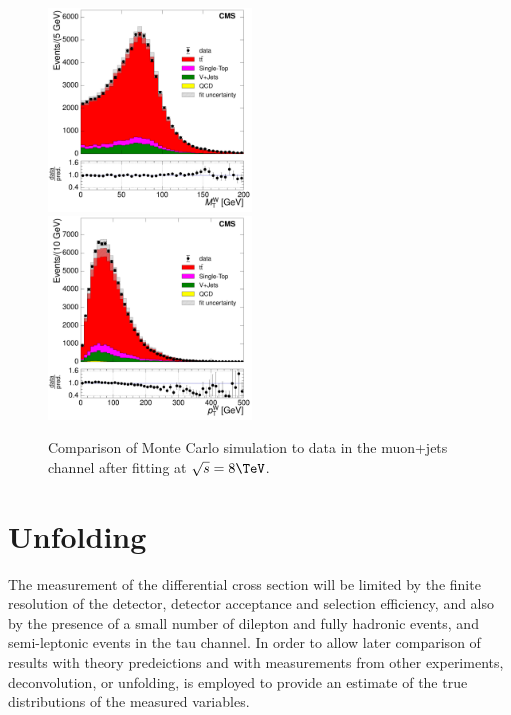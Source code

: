 \begin{figure}[hbtp]
     \includegraphics[width=0.48\textwidth]{Chapters/04_Analysis/04b_XSections/images/control_plots/after_fit/8TeV/MuPlusJets_patType1CorrectedPFMet_MT_2orMoreBtags_with_ratio.pdf}\\     
	 \includegraphics[width=0.48\textwidth]{Chapters/04_Analysis/04b_XSections/images/control_plots/after_fit/8TeV/MuPlusJets_patType1CorrectedPFMet_WPT_2orMoreBtags_with_ratio.pdf}\hfill
	 \caption{Comparison of Monte Carlo simulation to data in the muon+jets channel after fitting at
	 $\sqrt{s}=8\TeV$.}
     \label{fig:data_mc_comparison_after_fit_8TeV_muon}
\end{figure}

\FloatBarrier


\section{Unfolding}
\label{ss:unfolding}

The measurement of the differential cross section will be limited by the finite resolution of the detector,
detector acceptance and selection efficiency, and also by the presence of a small number of
dilepton and fully hadronic \ttbar events, and semi-leptonic events in the tau channel. In order to allow
later comparison of results with theory predeictions and with measurements from other experiments,
deconvolution, or unfolding, is employed to provide an estimate of the true distributions of the measured
variables.

